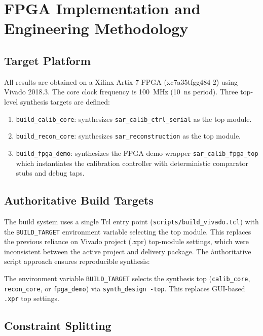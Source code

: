 \documentclass[journal]{IEEEtran}
\begin{document}
\section{FPGA Implementation and Engineering Methodology}
\label{sec:fpga}

\subsection{Target Platform}

All results are obtained on a Xilinx Artix-7 FPGA (xc7a35tfgg484-2) using
Vivado 2018.3. The core clock frequency is 100~MHz (10~ns period). Three
top-level synthesis targets are defined:

\begin{enumerate}
    \item \texttt{build\_calib\_core}: synthesizes \texttt{sar\_calib\_ctrl\_serial}
          as the top module.
    \item \texttt{build\_recon\_core}: synthesizes \texttt{sar\_reconstruction}
          as the top module.
    \item \texttt{build\_fpga\_demo}: synthesizes the FPGA demo wrapper
          \texttt{sar\_calib\_fpga\_top} which instantiates the calibration
          controller with deterministic comparator stubs and debug taps.
\end{enumerate}

\subsection{Authoritative Build Targets}

The build system uses a single Tcl entry point (\texttt{scripts/build\_vivado.tcl})
with the \texttt{BUILD\_TARGET} environment variable selecting the top module.
This replaces the previous reliance on Vivado project (.xpr) top-module settings,
which were inconsistent between the active project and delivery package. The
\`{a}uthoritative script approach ensures reproducible synthesis:

The environment variable \texttt{BUILD\_TARGET} selects the synthesis top
(\texttt{calib\_core}, \texttt{recon\_core}, or \texttt{fpga\_demo}) via
\texttt{synth\_design -top}. This replaces GUI-based \texttt{.xpr} top settings.
\label{eq:build_selection}

\subsection{Constraint Splitting}
\end{document}
